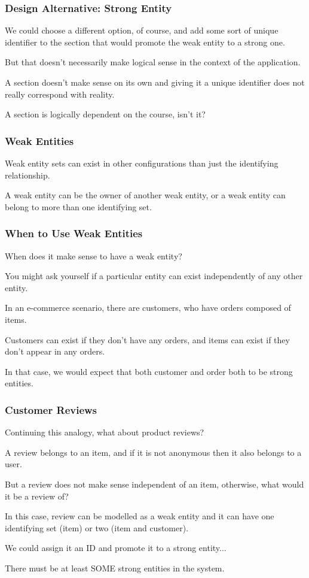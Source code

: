\begin{frame}
\frametitle{Design Alternative: Strong Entity}

We could choose a different option, of course, and add some sort of unique identifier to the section that would promote the weak entity to a strong one. 

But that doesn't necessarily make logical sense in the context of the application. 

A section doesn't make sense on its own and giving it a unique identifier does not really correspond with reality. 

A section is logically dependent on the course, isn't it?


\end{frame}



\begin{frame}
\frametitle{Weak Entities}

Weak entity sets can exist in other configurations than just the identifying relationship. 

A weak entity can be the owner of another weak entity, or a weak entity can belong to more than one identifying set.

\end{frame}


\begin{frame}
\frametitle{When to Use Weak Entities}

When does it make sense to have a weak entity? 

You might ask yourself if a particular entity can exist independently of any other entity. 

In an e-commerce scenario, there are customers, who have orders composed of items. 

Customers can exist if they don't have any orders, and items can exist if they don't appear in any orders. 

In that case, we would expect that both customer and order both to be strong entities.

\end{frame}



\begin{frame}
\frametitle{Customer Reviews}

Continuing this analogy, what about product reviews? 

A review belongs to an item, and if it is not anonymous then it also belongs to a user. 

But a review does not make sense independent of an item, otherwise, what would it be a review of? 

In this case, review can be modelled as a weak entity and it can have one identifying set (item) or two (item and customer).

We could assign it an ID and promote it to a strong entity...

There must be at least SOME strong entities in the system.

\end{frame}




